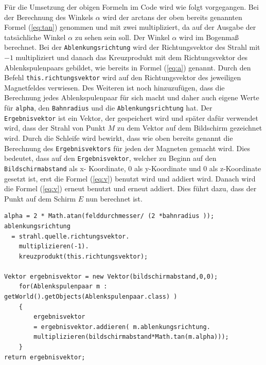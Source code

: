 





Für die Umsetzung der obigen Formeln im Code wird wie folgt vorgegangen. 
Bei der Berechnung des Winkels $\alpha$ wird der arctans der oben bereits genannten Formel (\ref{eq:tan}) genommen und mit zwei multipliziert, da auf der Ausgabe der tatsächliche Winkel $\alpha$ zu sehen sein soll.
Der Winkel $\alpha$ wird im Bogenmaß berechnet.
Bei der \lstinline$Ablenkungsrichtung$ wird der Richtungsvektor des Strahl mit $-1$ multipliziert und danach das Kreuzprodukt mit dem Richtungsvektor des Ablenkspulenpaars gebildet, wie bereits in Formel (\ref{eq:a}) genannt.
Durch den Befehl \lstinline$this.richtungsvektor$ wird auf den Richtungsvektor des jeweiligen Magnetfeldes verwiesen.
Des Weiteren ist noch hinzuzufügen, dass die Berechnung jedes Ablenkspulenpaar für sich macht und daher auch eigene Werte für \lstinline$alpha$, den \lstinline$Bahnradius$ und die \lstinline$Ablenkungsrichtung$ hat.
Der \lstinline$Ergebnisvektor$ ist ein Vektor, der gespeichert wird und später dafür verwendet wird, dass der Strahl von Punkt $M$ zu dem Vektor auf dem Bildschirm gezeichnet wird.
Durch die Schleife wird bewirkt, dass wie oben bereits genannt die Berechnung des \lstinline$Ergebnisvektors$ für jeden der Magneten gemacht wird.
Dies bedeutet, dass auf den \lstinline$Ergebnisvektor$, welcher zu Beginn auf den \lstinline$Bildschirmabstand$ als x- Koordinate, $0$ als y-Koordinate und 0 als z-Koordinate gesetzt ist, erst die Formel (\ref{eq:v}) benutzt wird und addiert wird.
Danach wird die Formel (\ref{eq:v}) erneut benutzt und erneut addiert. Dies führt dazu, dass der Punkt auf dem Schirm $E$ nun berechnet ist.

\begin{lstlisting}
alpha = 2 * Math.atan(felddurchmesser/ (2 *bahnradius ));
ablenkungsrichtung
  = strahl.quelle.richtungsvektor.
    multiplizieren(-1).
    kreuzprodukt(this.richtungsvektor);

Vektor ergebnisvektor = new Vektor(bildschirmabstand,0,0);
    for(Ablenkspulenpaar m : getWorld().getObjects(Ablenkspulenpaar.class) )
    {
        ergebnisvektor 
        = ergebnisvektor.addieren( m.ablenkungsrichtung.
        multiplizieren(bildschirmabstand*Math.tan(m.alpha)));
    }
return ergebnisvektor;

\end{lstlisting}


